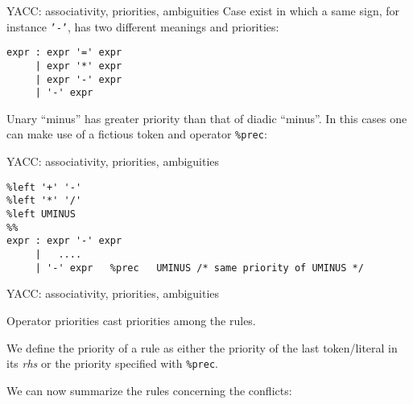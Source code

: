 \begin{frame}[fragile]{YACC: associativity, priorities, ambiguities}
Case exist in which a same sign, for instance {\tt '-'},
has two different meanings and priorities:


\vspace{20pt}

\begin{verbatim}
expr : expr '=' expr
     | expr '*' expr
     | expr '-' expr
     | '-' expr
\end{verbatim}


\vspace{20pt}

Unary ``minus'' has greater priority than that of diadic ``minus''.
In this cases one can make use of a fictious token and operator  \verb"%prec":

\end{frame}
\begin{frame}[fragile]{YACC: associativity, priorities, ambiguities}
\begin{verbatim}
%left '+' '-'
%left '*' '/'
%left UMINUS
%%
expr : expr '-' expr
     |   ....
     | '-' expr   %prec   UMINUS /* same priority of UMINUS */
\end{verbatim}



\end{frame}
\begin{frame}[fragile]{YACC: associativity, priorities, ambiguities}

Operator priorities cast priorities among the rules.


\vspace{20pt}

We define the priority of a rule as either the priority of the
last token/literal in its {\em rhs} or the priority
specified with \verb"%prec".


\vspace{20pt}

We can now summarize the rules concerning the conflicts:



\end{frame}
